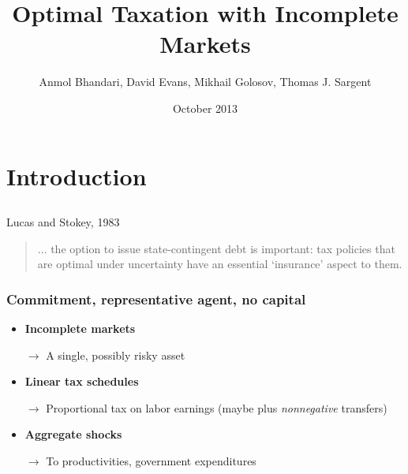 \documentclass{beamer}
\title {Optimal Taxation with Incomplete Markets}
\author{Anmol Bhandari, David Evans, Mikhail Golosov, Thomas J. Sargent}
\date{October 2013}
\begin{document}
%
\begin{frame}
\titlepage

\end{frame}
\section{Introduction}
\subsection{}

\begin{frame}{Lucas and Stokey, 1983}

\begin{quote}
$\ldots$ the option to issue state-contingent debt is important: tax policies that
are optimal under uncertainty have an essential `insurance' aspect to them.
\end{quote}
\end{frame}

\begin{frame}
\frametitle{Commitment, representative agent, no capital}

\begin{itemize}

 \item \textbf{Incomplete markets}

 \quad \color{red}$\rightarrow$ \color{black} A single, possibly risky asset

 \item \textbf{Linear tax schedules}

 \quad \color{red}$\rightarrow$ \color{black}Proportional tax on labor earnings (maybe plus  {\em nonnegative} transfers)

 \item \textbf{Aggregate shocks}

 \quad \color{red}$\rightarrow$ \color{black} To productivities, government expenditures

 \end{itemize}
\end{frame}
\end{document}
